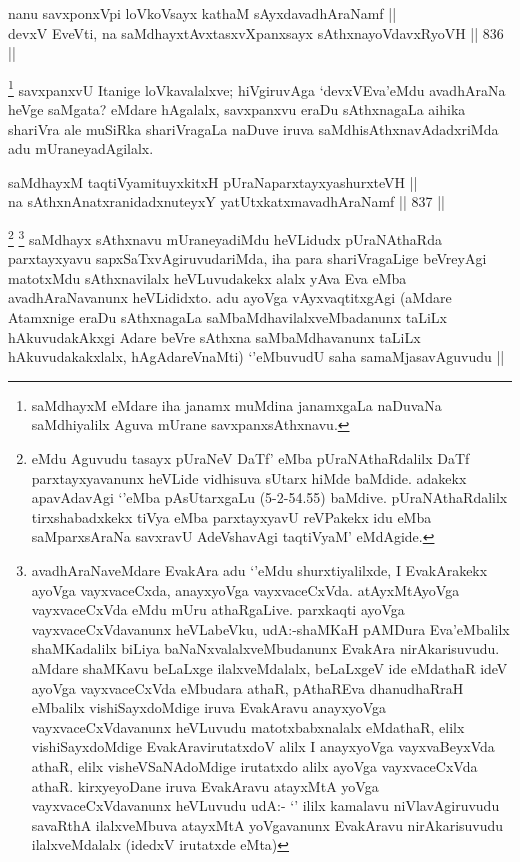 
\begin{shl}
nanu savxponxV\s pi loVkoV\s sayx kathaM sAyxdavadhAraNamf || \\
devxV EveVti, na saMdhayxtAvxtasxvXpanxsayx sAthxnayoVdavxRyoVH ||  836 ||  
\end{shl}

\begin{artha}
\footnote{saMdhayxM eMdare iha janamx muMdina janamxgaLa naDuvaNa saMdhiyalilx Aguva mUrane savxpanxsAthxnavu.}
savxpanxvU Itanige loVkavalalxve; hiVgiruvAga `devxVEva'eMdu avadhAraNa heVge saMgata? eMdare hAgalalx, savxpanxvu eraDu sAthxnagaLa aihika shariVra ale muSiRka shariVragaLa naDuve iruva saMdhisAthxnavAdadxriMda adu mUraneyadAgilalx. 
\end{artha}


\begin{shl}
saMdhayxM taqtiVyamituyxkitxH pUraNaparxtayxyashurxteVH || \\
na sAthxnAnatxranidadxnuteyxY yatUtxkatxmavadhAraNamf ||  837 ||  
\end{shl}

\begin{artha}
\footnote{\stext eMdu Aguvudu tasayx pUraNeV DaTf' eMba pUraNAthaRdalilx DaTf parxtayxyavanunx heVLide vidhisuva sUtarx hiMde baMdide. adakekx apavAdavAgi `\stext'eMba pAsUtarxgaLu (5-2-54.55) baMdive. pUraNAthaRdalilx tirxshabadxkekx tiVya eMba parxtayxyavU reVPakekx idu eMba saMparxsAraNa savxravU AdeVshavAgi taqtiVyaM' eMdAgide.}
\footnote{avadhAraNaveMdare EvakAra adu `\stext'eMdu shurxtiyalilxde, I EvakArakekx ayoVga vayxvaceCxda, anayxyoVga vayxvaceCxVda. atAyxMtAyoVga vayxvaceCxVda eMdu mUru athaRgaLive. parxkaqti ayoVga vayxvaceCxVdavanunx heVLabeVku, udA:-shaMKaH pAMDura Eva'eMbalilx shaMKadalilx biLiya baNaNxvalalxveMbudanunx EvakAra nirAkarisuvudu. aMdare shaMKavu beLaLxge ilalxveMdalalx, beLaLxgeV ide eMdathaR ideV ayoVga vayxvaceCxVda eMbudara athaR, pAthaREva dhanudhaRraH eMbalilx vishiSayxdoMdige iruva EvakAravu anayxyoVga vayxvaceCxVdavanunx heVLuvudu matotxbabxnalalx eMdathaR, elilx vishiSayxdoMdige EvakAravirutatxdoV alilx I anayxyoVga vayxvaBeyxVda athaR, elilx visheVSaNAdoMdige irutatxdo alilx ayoVga vayxvaceCxVda athaR. kirxyeyoDane iruva EvakAravu atayxMtA yoVga vayxvaceCxVdavanunx heVLuvudu udA:- `\stext' ililx kamalavu niVlavAgiruvudu savaRthA ilalxveMbuva atayxMtA yoVgavanunx EvakAravu nirAkarisuvudu ilalxveMdalalx (idedxV irutatxde eMta)}
saMdhayx sAthxnavu mUraneyadiMdu heVLidudx pUraNAthaRda parxtayxyavu sapxSaTxvAgiruvudariMda, iha para shariVragaLige beVreyAgi matotxMdu sAthxnavilalx heVLuvudakekx alalx yAva Eva eMba avadhAraNavanunx heVLididxto. adu ayoVga vAyxvaqtitxgAgi (aMdare Atamxnige eraDu sAthxnagaLa saMbaMdhavilalxveMbadanunx taLiLx hAkuvudakAkxgi Adare beVre sAthxna saMbaMdhavanunx taLiLx hAkuvudakakxlalx, hAgAdareVnaMti) `\stext'eMbuvudU saha samaMjasavAguvudu ||
\end{artha}

